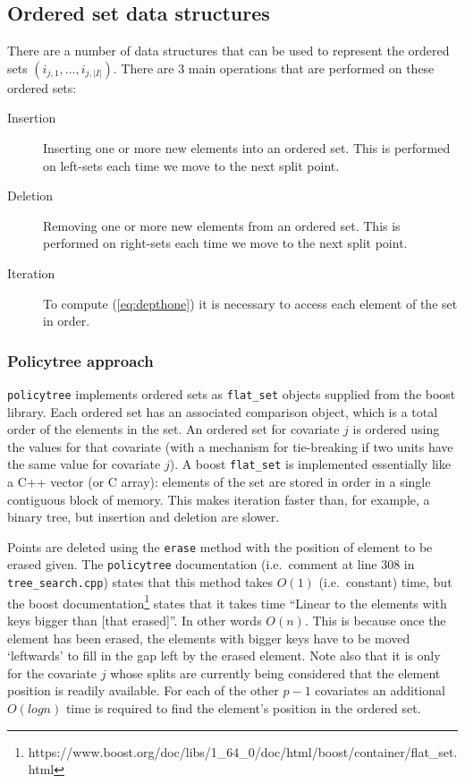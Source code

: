 \documentclass{article}
\newcommand{\policytree}{\texttt{policytree}}
\begin{document}
\subsection{Ordered set data structures}
\label{sec:orderedsets}

There are a number of data structures that can be used to represent
the ordered sets $(i_{j,1}, \dots, i_{j,|I|})$. There are 3 main
operations that are performed on these ordered sets:
\begin{description}
\item[Insertion] Inserting one or more new elements into an ordered
  set. This is performed on left-sets each time we move to the next
  split point.
\item[Deletion] Removing one or more new elements from an ordered
  set. This is performed on right-sets each time we move to the next
  split point.
\item[Iteration] To compute (\ref{eq:depthone}) it is necessary to
  access each element of the set in order.
\end{description}

\subsubsection{Policytree approach}
\label{sec:policytreeos}

\policytree{} implements ordered sets as \texttt{flat\_set} objects
supplied from the boost library. Each ordered set has an associated
comparison object, which is a total order of the elements in the
set. An ordered set for covariate $j$ is ordered using the values for
that covariate (with a mechanism for tie-breaking if two units have
the same value for covariate $j$). A boost \texttt{flat\_set} is
implemented essentially like a C++ vector (or C array): elements of
the set are stored in order in a single contiguous block of
memory. This makes iteration faster than, for example, a binary tree,
but insertion and deletion are slower.

Points are deleted using the \texttt{erase} method with the position
of element to be erased given. The \policytree{} documentation (i.e.\
comment at line 308 in \verb+tree_search.cpp+) states that this method
takes $O(1)$ (i.e.\ constant) time, but the boost
documentation\footnote{https://www.boost.org/doc/libs/1\_64\_0/doc/html/boost/container/flat\_set.html}
states that it takes time ``Linear to the elements with keys bigger
than [that erased]''. In other words $O(n)$. This is because once the
element has been erased, the elements with bigger keys have to be
moved `leftwards' to fill in the gap left by the erased element. Note
also that it is only for the covariate $j$ whose splits are currently
being considered that the element position is readily available. For
each of the other $p-1$ covariates an additional $O(log n)$ time is
required to find the element's position in the ordered set.
\end{document}
